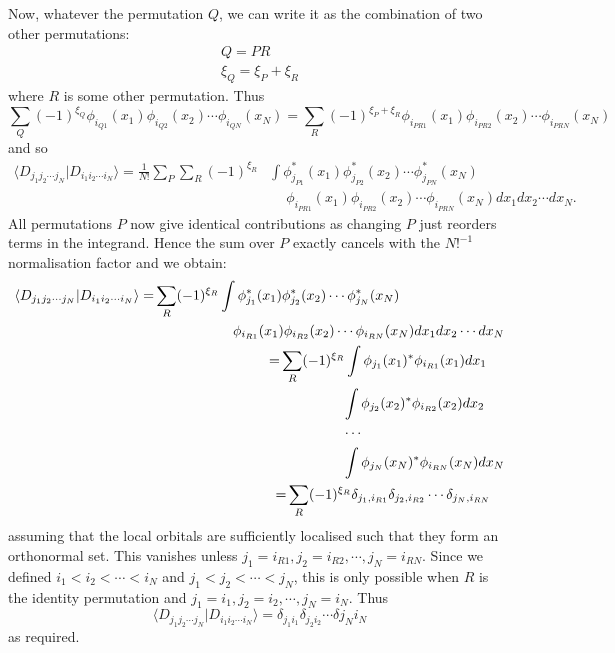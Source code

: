 \documentclass[a4paper, 11pt]{revtex4}
\newcommand{\bra}{\langle}
\newcommand{\ket}{\rangle}
\begin{document}
Now, whatever the permutation $Q$, we can write it as the combination of two other permutations:
\begin{gather}
Q = PR \\
\xi_Q = \xi_P + \xi_R
\end{gather}
where $R$ is some other permutation.  Thus
\begin{equation}
\sum_Q (-1)^{\xi_Q} \phi_{i_{Q1}}(x_1) \phi_{i_{Q2}}(x_2) \cdots \phi_{i_{QN}}(x_N) = \sum_R 
(-1)^{\xi_P + \xi_R} \phi_{i_{PR1}}(x_1) \phi_{i_{PR2}}(x_2) \cdots \phi_{i_{PRN}}(x_N) 
\end{equation}
and so 
\begin{equation}
\begin{split}
\bra D_{j_1j_2\cdots j_N} | D_{i_1i_2\cdots i_N} \ket = \frac{1}{N!} \sum_P \sum_R (-1)^{\xi_R}
& \int 
\phi_{j_{P1}}^*(x_1) \phi_{j_{P2}}^*(x_2) \cdots \phi_{j_{PN}}^*(x_N) \\
& \quad\ \phi_{i_{PR1}}(x_1) \phi_{i_{PR2}}(x_2) \cdots \phi_{i_{PRN}}(x_N) 
dx_1 dx_2 \cdots dx_N.
\end{split}
\end{equation}
All permutations $P$ now give identical contributions as changing $P$ just reorders terms in the integrand.  Hence the sum over $P$ exactly cancels with the $N!^{-1}$ normalisation factor and we obtain:
\begin{align}
\begin{split}
\bra D_{j_1j_2\cdots j_N} | D_{i_1i_2\cdots i_N} \ket =&
\sum_R (-1)^{\xi_R} \int
\phi_{j_{1}}^*(x_1) \phi_{j_{2}}^*(x_2) \cdots \phi_{j_{N}}^*(x_N) \\
&\hphantom{\sum_R (-1)^{\xi_R}\int} \phi_{i_{R1}}(x_1) \phi_{i_{R2}}(x_2) \cdots \phi_{i_{RN}}(x_N) 
dx_1 dx_2 \cdots dx_N
\end{split} \\
\begin{split}
=&
\sum_R (-1)^{\xi_R} 
\int \phi_{j_{1}}(x_1)^* \phi_{i_{R1}}(x_1) dx_1 \\
& \hphantom{\sum_R (-1)^{\xi_R}}
\int \phi_{j_{2}}(x_2)^* \phi_{i_{R2}}(x_2) dx_2 \\
& \hphantom{\sum_R (-1)^{\xi_R}}
\cdots \\
& \hphantom{\sum_R (-1)^{\xi_R}}
\int \phi_{j_{N}}(x_N)^* \phi_{i_{RN}}(x_N) dx_N 
\end{split} \\
\begin{split}
=& \sum_R (-1)^{\xi_R} 
\delta_{j_1,i_{R1}}
\delta_{j_2,i_{R2}}
\cdots
\delta_{j_N,i_{RN}}
\end{split}
\end{align}
assuming that the local orbitals are sufficiently localised such that they form an orthonormal set.  This vanishes unless $j_1=i_{R1}, j_2=i_{R2}, \cdots, j_N=i_{RN}$.  Since we defined $i_1<i_2<\cdots<i_N$ and $j_1<j_2<\cdots<j_N$, this is only possible when $R$ is the identity permutation and $j_1=i_1, j_2=i_2, \cdots, j_N=i_N$.  Thus
\begin{equation}
\bra D_{j_1j_2\cdots j_N} | D_{i_1i_2\cdots i_N} \ket = \delta_{j_1i_1} \delta_{j_2i_2} \cdots \delta{j_Ni_N}
\end{equation}
as required.
\end{document}
